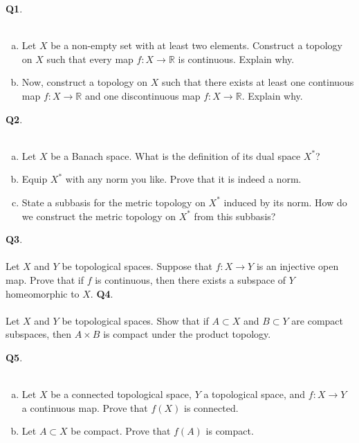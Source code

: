 \documentclass[12pt, oneside]{amsart}
\newcommand{\rr}{\mathbb{R}}
\begin{document}
\vfill


\newpage
\noindent
 \textbf{Q1}. \\ \\ 
\begin{enumerate}[a)]
  \item
    Let $X$ be a non-empty set with at least two elements. Construct a topology on $X$ such that every map $f: X \to \rr$ is continuous. Explain why.

    \vspace{10cm}
  \item 
    Now, construct a topology on $X$ such that there exists at least one continuous map $f: X \to \rr$ and one discontinuous map $f: X \to \rr$. Explain why.  
        \vspace{3cm}

\end{enumerate}

\newpage
\noindent
\textbf{Q2}. 
\\
\\
\begin{enumerate}[a)]
  \item
Let $X$ be a Banach space.
      What is the definition of its dual space $X^*$?  
      
     \vspace{6cm}
   \item
     Equip $X^*$ with any norm you like. Prove that it is indeed a norm. 
     \vspace{10cm}
 \item State a subbasis for the metric topology on $X^*$ induced by its norm. How do we construct the metric topology on $X^*$ from this subbasis?   

       
        \end{enumerate}
\newpage
\noindent
\textbf{Q3}. 
\\
\\ 
Let $X$ and $Y$ be topological spaces. Suppose that $f : X \to Y$ is an injective open
map. Prove that if $f$ is continuous, then there exists a subspace of $Y$ homeomorphic to $X$.
\vspace{10cm}
\newpage
\noindent
\textbf{Q4}.
\\
\\
Let $X$ and $Y$ be topological spaces. Show that if $A \subset X$ and $B \subset Y$ are compact subspaces, then $A \times B$ is compact under the product topology.   

\newpage

\noindent
\textbf{Q5}.
\\
\\
\begin{enumerate}[a)]
    \item Let $X$ be a connected topological space, $Y$ a topological space, and $f: X \to Y$ a continuous map. Prove that $f(X)$ is connected.
	\vspace{10cm}
    \item	
Let $A \subset X$ be compact. Prove that $f(A)$ is compact. 
\end{enumerate}
\newpage
\end{document}
